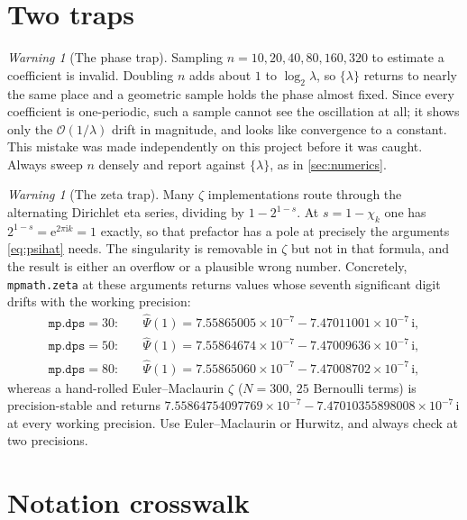 \documentclass[11pt,oneside]{article}
\theoremstyle{definition}
\theoremstyle{remark}
\newtheorem{warning}[theorem]{Warning}
\newcommand{\e}{\mathrm e}
\newcommand{\ii}{\mathrm i}
\newcommand{\bigO}{\mathcal O}
\newcommand{\Psihat}{\widehat\Psi}
\begin{document}
\section{Two traps}\label{sec:traps}

\begin{warning}[The phase trap]
Sampling $n=10,20,40,80,160,320$ to estimate a coefficient is invalid.  Doubling
$n$ adds about $1$ to $\log_2\lambda$, so $\{\lambda\}$ returns to nearly the
same place and a geometric sample holds the phase almost fixed.  Since every
coefficient is one-periodic, such a sample cannot see the oscillation at all;
it shows only the $\bigO(1/\lambda)$ drift in magnitude, and looks like
convergence to a constant.  This mistake was made independently on this project
before it was caught.  Always sweep $n$ densely and report against
$\{\lambda\}$, as in \cref{sec:numerics}.
\end{warning}

\begin{warning}[The zeta trap]
Many $\zeta$ implementations route through the alternating Dirichlet eta
series, dividing by $1-2^{1-s}$.  At $s=1-\chi_k$ one has
$2^{1-s}=\e^{2\pi\ii k}=1$ exactly, so that prefactor has a pole at precisely
the arguments \cref{eq:psihat} needs.  The singularity is removable in $\zeta$
but not in that formula, and the result is either an overflow or a plausible
wrong number.  Concretely, \texttt{mpmath.zeta} at these arguments returns
values whose seventh significant digit drifts with the working precision:
\[
\begin{aligned}
  \texttt{mp.dps}=30:&\quad \Psihat(1)=7.55865005\times10^{-7}-7.47011001\times10^{-7}\,\ii,\\
  \texttt{mp.dps}=50:&\quad \Psihat(1)=7.55864674\times10^{-7}-7.47009636\times10^{-7}\,\ii,\\
  \texttt{mp.dps}=80:&\quad \Psihat(1)=7.55865060\times10^{-7}-7.47008702\times10^{-7}\,\ii,
\end{aligned}
\]
whereas a hand-rolled Euler--Maclaurin $\zeta$ ($N=300$, $25$ Bernoulli terms)
is precision-stable and returns
$7.55864754097769\times10^{-7}-7.47010355898008\times10^{-7}\,\ii$ at every
working precision.  Use Euler--Maclaurin or Hurwitz, and always check at two
precisions.
\end{warning}

\section{Notation crosswalk}\label{sec:crosswalk}
\end{document}
